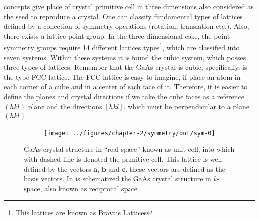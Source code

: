concepts give place of crystal primitive cell in three dimensions also considered as the seed to reproduce a crystal. One can classify fundamental types of lattices defined by a collection of symmetry operations (rotation, translation etc.). Also, there exists a lattice point group. In the three-dimensional case, the point symmetry groups require  14 different lattices types\footnote{This lattices are known as Bravais Lattices}, which are classified into seven systems. Within these systems it is found the cubic system, which posses three types of lattices. Remember that the GaAs crystal is cubic, specifically, is the type FCC lattice. The FCC lattice is easy to imagine, if place an atom in each corner of a cube and in a center of each face of it. Therefore, it is easier to define the planes and crystal directions if we take the cube faces as a reference $(hkl)$ plane and the directions $\left[hkl\right]$, which must be perpendicular to a plane $(hkl)$ \cite{kittel2018kittel}.

\begin{figure}[h!]
	\centering
	\begin{subfigure}{\textwidth}
		\texttt{[image: ../figures/chapter-2/symmetry/out/sym-0]}
		\label{subfig:subsubsection-2.1-crystal-rspace-a)}
		\label{subfig:subsubsection-2.1-crystal-kspace-b)}
	\end{subfigure}
	\caption{
		 GaAs crystal structure in “real space” known as unit cell, into which with dashed line is denoted the primitive cell. This lattice is well-defined by the vectors  $\mathbf{a}$, $\mathbf{b}$ and  $\mathbf{c}$, these vectors are defined as the basis vectors. In  is schematized the GaAs crystal
structure in $k$-space, also known as reciprocal space.
		}
	\label{fig:subsubsection-2.1-crystal-r-k-space}
\end{figure}

